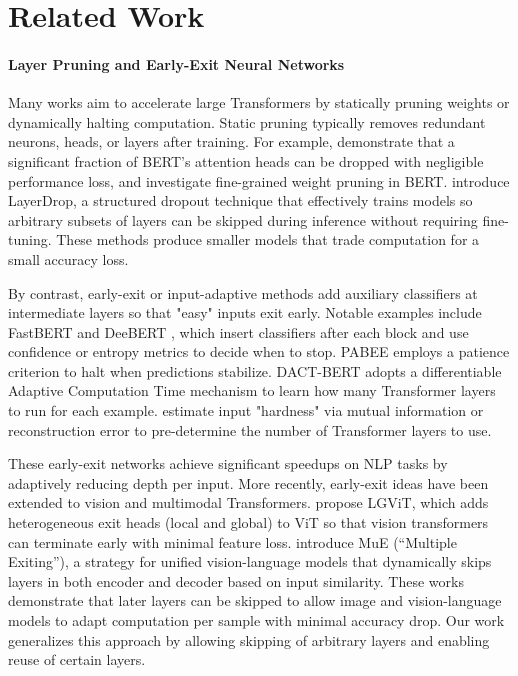 \documentclass{article}
\theoremstyle{plain}
\theoremstyle{definition}
\theoremstyle{remark}
\begin{document}
\newpage
\clearpage



\newpage
\appendix
\onecolumn


\section{Related Work}

\paragraph{Layer Pruning and Early-Exit Neural Networks}
Many works aim to accelerate large Transformers by statically pruning weights or dynamically halting computation. Static pruning typically removes redundant neurons, heads, or layers after training. For example, \citet{liu2021ebert} demonstrate that a significant fraction of BERT's attention heads can be dropped with negligible performance loss, and \citet{gordon2020compressing} investigate fine-grained weight pruning in BERT. \cite{fan2019reducing} introduce LayerDrop, a structured dropout technique that effectively trains models so arbitrary subsets of layers can be skipped during inference without requiring fine-tuning. 
These methods produce smaller models that trade computation for a small accuracy loss.

By contrast, early-exit or input-adaptive methods add auxiliary classifiers at intermediate layers so that "easy" inputs exit early. Notable examples include FastBERT \cite{liu2020fastbert} and DeeBERT \cite{xin2020deebert}, which insert classifiers after each block and use confidence or entropy metrics to decide when to stop. PABEE \cite{zhou2020bert} employs a patience criterion to halt when predictions stabilize. DACT-BERT \cite{eyzaguirre2022dact} adopts a differentiable Adaptive Computation Time mechanism to learn how many Transformer layers to run for each example. \citet{liu2021faster} estimate input "hardness" via mutual information or reconstruction error to pre-determine the number of Transformer layers to use.

These early-exit networks achieve significant speedups on NLP tasks by adaptively reducing depth per input. More recently, early-exit ideas have been extended to vision and multimodal Transformers. \citet{xu2023lgvit} propose LGViT, which adds heterogeneous exit heads (local and global) to ViT so that vision transformers can terminate early with minimal feature loss. \citet{tang2023you} introduce MuE (``Multiple Exiting''), a strategy for unified vision-language models that dynamically skips layers in both encoder and decoder based on input similarity. These works demonstrate that later layers can be skipped to allow image and vision-language models to adapt computation per sample with minimal accuracy drop. Our work generalizes this approach by allowing skipping of arbitrary layers and enabling reuse of certain layers.
\end{document}
